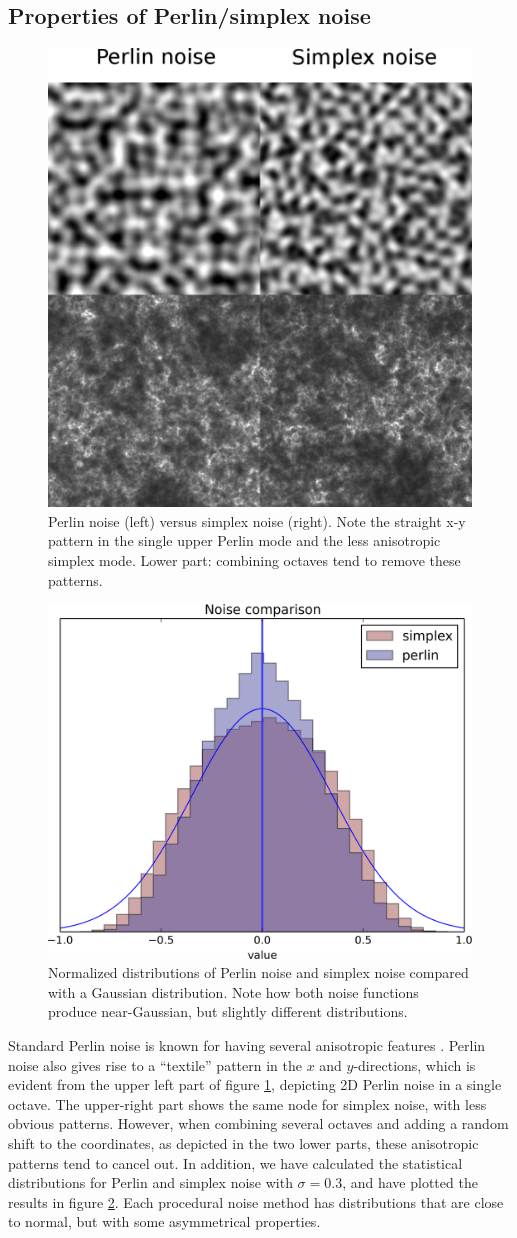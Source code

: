 \documentclass[aps,pre,twocolumn,letterpaper,floatfix,showpacs]{revtex4}
\begin{document}
\subsection{Properties of Perlin/simplex noise}
\begin{figure}
\includegraphics[width=.5\textwidth]{noise.eps}
\caption{Perlin noise (left) versus simplex noise (right). Note the
  straight x-y pattern in the single upper Perlin mode and the less
  anisotropic simplex mode. Lower part: combining octaves tend
  to remove these patterns.}
\label{fig:noise}
\end{figure}

\begin{figure}
\includegraphics[width=.5\textwidth]{noise_comparison.png}
\caption{Normalized distributions of Perlin noise and simplex noise compared with a
  Gaussian distribution. Note how both noise functions produce
  near-Gaussian, but slightly different distributions.}
\label{fig:properties}
\end{figure}
Standard Perlin noise is known for having several anisotropic features
\citep{lagae:2010}. Perlin noise also gives rise to a ``textile''
pattern in the $x$ and $y$-directions, which is evident from the upper
left part of figure \ref{fig:noise}, depicting 2D Perlin noise in
a single octave. The upper-right part shows the same node for simplex noise,
with less obvious patterns. However, when combining several octaves and adding a random shift to the coordinates,
as depicted in the two lower parts, these anisotropic patterns tend to cancel
out.  In addition, we have calculated the statistical distributions for Perlin and simplex noise
with $\sigma = 0.3$, and have plotted the results in figure \ref{fig:properties}.
Each procedural noise method has distributions that are close to normal, 
but with some asymmetrical properties. 
\end{document}
